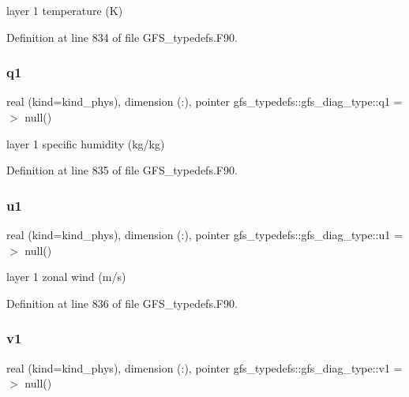 layer 1 temperature (K) 



Definition at line 834 of file G\+F\+S\+\_\+typedefs.\+F90.

\mbox{\label{structgfs__typedefs_1_1gfs__diag__type_a8fe0fbdb11a584a5a5851b747d63e814}} 
\subsubsection{q1}
{\footnotesize\ttfamily real (kind=kind\+\_\+phys), dimension     (\+:), pointer gfs\+\_\+typedefs\+::gfs\+\_\+diag\+\_\+type\+::q1 =$>$ null()}



layer 1 specific humidity (kg/kg) 



Definition at line 835 of file G\+F\+S\+\_\+typedefs.\+F90.

\mbox{\label{structgfs__typedefs_1_1gfs__diag__type_af0c9a03bdfbde1268bf4fd19de3dcbcc}} 
\subsubsection{u1}
{\footnotesize\ttfamily real (kind=kind\+\_\+phys), dimension     (\+:), pointer gfs\+\_\+typedefs\+::gfs\+\_\+diag\+\_\+type\+::u1 =$>$ null()}



layer 1 zonal wind (m/s) 



Definition at line 836 of file G\+F\+S\+\_\+typedefs.\+F90.

\mbox{\label{structgfs__typedefs_1_1gfs__diag__type_af93272620918af90c5bd249f168258d6}} 
\subsubsection{v1}
{\footnotesize\ttfamily real (kind=kind\+\_\+phys), dimension     (\+:), pointer gfs\+\_\+typedefs\+::gfs\+\_\+diag\+\_\+type\+::v1 =$>$ null()}



